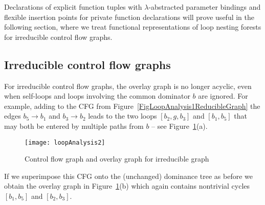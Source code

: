 Declarations of explicit function tuples with $\lambda$-abstracted
parameter bindings and flexible insertion points for private function
declarations will prove useful in the following section, where we
treat functional representations of loop nesting forests for
irreducible control flow graphs.

\subsection{Irreducible control flow graphs}
For irreducible control flow graphs, the overlay graph is no longer
acyclic, even when self-loops and loops involving the common dominator
$b$ are ignored. For example, adding to the CFG from
Figure~\ref{FigLoopAnalysis1ReducibleGraph} the edges $b_5 \to b_1$
and $b_3 \to b_2$ leads to the two loops $[b_2,g,b_3]$ and $[b_1,b_5]$
that may both be entered by multiple paths from $b$ -- see
Figure~\ref{FigLoopAnalysis2IrreducibleGraph}(a).

\begin{figure}
\begin{center}
\texttt{[image: loopAnalysis2]}
\end{center}
\caption{\label{FigLoopAnalysis2IrreducibleGraph} Control flow graph and overlay graph for irreducible graph}
\end{figure}
If we superimpose this CFG onto the (unchanged) dominance tree as
before we obtain the overlay graph in
Figure~\ref{FigLoopAnalysis2IrreducibleGraph}(b) which again contains
nontrivial cycles $[b_1,b_5]$ and $[b_2,b_3]$.

